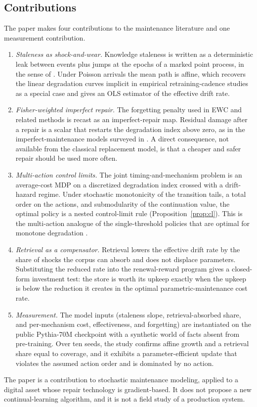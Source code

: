 \documentclass[journal]{IEEEtran}
\begin{document}
\subsection{Contributions}
The paper makes four contributions to the maintenance literature and one measurement contribution.
\begin{enumerate}
\item \emph{Staleness as shock-and-wear.} Knowledge staleness is written as a deterministic leak between events plus jumps at the epochs of a marked point process, in the sense of \cite{vannoortwijk2009}. Under Poisson arrivals the mean path is affine, which recovers the linear degradation curves implicit in empirical retraining-cadence studies as a special case and gives an OLS estimator of the effective drift rate.
\item \emph{Fisher-weighted imperfect repair.} The forgetting penalty used in EWC and related methods \cite{kirkpatrick2017} is recast as an imperfect-repair map. Residual damage after a repair is a scalar that restarts the degradation index above zero, as in the imperfect-maintenance models surveyed in \cite{pham1996}. A direct consequence, not available from the classical replacement model, is that a cheaper and safer repair should be used more often.
\item \emph{Multi-action control limits.} The joint timing-and-mechanism problem is an average-cost MDP on a discretized degradation index crossed with a drift-hazard regime. Under stochastic monotonicity of the transition tails, a total order on the actions, and submodularity of the continuation value, the optimal policy is a nested control-limit rule (Proposition~\ref{prop:cl}). This is the multi-action analogue of the single-threshold policies that are optimal for monotone degradation \cite{barlow1965,wang2002}.
\item \emph{Retrieval as a compensator.} Retrieval lowers the effective drift rate by the share of shocks the corpus can absorb and does not displace parameters. Substituting the reduced rate into the renewal-reward program gives a closed-form investment test: the store is worth its upkeep exactly when the upkeep is below the reduction it creates in the optimal parametric-maintenance cost rate.
\item \emph{Measurement.} The model inputs (staleness slope, retrieval-absorbed share, and per-mechanism cost, effectiveness, and forgetting) are instantiated on the public Pythia-70M checkpoint \cite{biderman2023} with a synthetic world of facts absent from pre-training. Over ten seeds, the study confirms affine growth and a retrieval share equal to coverage, and it exhibits a parameter-efficient update that violates the assumed action order and is dominated by no action.
\end{enumerate}
The paper is a contribution to stochastic maintenance modeling, applied to a digital asset whose repair technology is gradient-based. It does not propose a new continual-learning algorithm, and it is not a field study of a production system.
\end{document}
